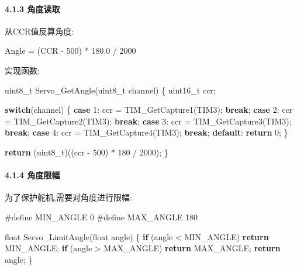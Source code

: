 \documentclass[
]{article}
\newenvironment{Shaded}{}{}
\newcommand{\ControlFlowTok}[1]{\textcolor[rgb]{0.00,0.44,0.13}{\textbf{#1}}}
\newcommand{\DataTypeTok}[1]{\textcolor[rgb]{0.56,0.13,0.00}{#1}}
\newcommand{\DecValTok}[1]{\textcolor[rgb]{0.25,0.63,0.44}{#1}}
\newcommand{\FloatTok}[1]{\textcolor[rgb]{0.25,0.63,0.44}{#1}}
\newcommand{\NormalTok}[1]{#1}
\newcommand{\PreprocessorTok}[1]{\textcolor[rgb]{0.74,0.48,0.00}{#1}}
\begin{document}
\hypertarget{ux89d2ux5ea6ux8bfbux53d6}{%
\paragraph{4.1.3 角度读取}\label{ux89d2ux5ea6ux8bfbux53d6}}

从CCR值反算角度:

\begin{Shaded}
\begin{Highlighting}[]
\NormalTok{Angle = (CCR {-} }\DecValTok{500}\NormalTok{) * }\FloatTok{180.0}\NormalTok{ / }\DecValTok{2000}
\end{Highlighting}
\end{Shaded}

实现函数:

\begin{Shaded}
\begin{Highlighting}[]
\DataTypeTok{uint8\_t}\NormalTok{ Servo\_GetAngle(}\DataTypeTok{uint8\_t}\NormalTok{ channel)}
\NormalTok{\{}
    \DataTypeTok{uint16\_t}\NormalTok{ ccr;}
    
    \ControlFlowTok{switch}\NormalTok{(channel) \{}
        \ControlFlowTok{case} \DecValTok{1}\NormalTok{: ccr = TIM\_GetCapture1(TIM3); }\ControlFlowTok{break}\NormalTok{;}
        \ControlFlowTok{case} \DecValTok{2}\NormalTok{: ccr = TIM\_GetCapture2(TIM3); }\ControlFlowTok{break}\NormalTok{;}
        \ControlFlowTok{case} \DecValTok{3}\NormalTok{: ccr = TIM\_GetCapture3(TIM3); }\ControlFlowTok{break}\NormalTok{;}
        \ControlFlowTok{case} \DecValTok{4}\NormalTok{: ccr = TIM\_GetCapture4(TIM3); }\ControlFlowTok{break}\NormalTok{;}
        \ControlFlowTok{default}\NormalTok{: }\ControlFlowTok{return} \DecValTok{0}\NormalTok{;}
\NormalTok{    \}}
    
    \ControlFlowTok{return}\NormalTok{ (}\DataTypeTok{uint8\_t}\NormalTok{)((ccr {-} }\DecValTok{500}\NormalTok{) * }\DecValTok{180}\NormalTok{ / }\DecValTok{2000}\NormalTok{);}
\NormalTok{\}}
\end{Highlighting}
\end{Shaded}

\hypertarget{ux89d2ux5ea6ux9650ux5e45}{%
\paragraph{4.1.4 角度限幅}\label{ux89d2ux5ea6ux9650ux5e45}}

为了保护舵机,需要对角度进行限幅:

\begin{Shaded}
\begin{Highlighting}[]
\PreprocessorTok{\#define MIN\_ANGLE 0}
\PreprocessorTok{\#define MAX\_ANGLE 180}

\DataTypeTok{float}\NormalTok{ Servo\_LimitAngle(}\DataTypeTok{float}\NormalTok{ angle)}
\NormalTok{\{}
    \ControlFlowTok{if}\NormalTok{ (angle \textless{} MIN\_ANGLE) }\ControlFlowTok{return}\NormalTok{ MIN\_ANGLE;}
    \ControlFlowTok{if}\NormalTok{ (angle \textgreater{} MAX\_ANGLE) }\ControlFlowTok{return}\NormalTok{ MAX\_ANGLE;}
    \ControlFlowTok{return}\NormalTok{ angle;}
\NormalTok{\}}
\end{Highlighting}
\end{Shaded}
\end{document}
